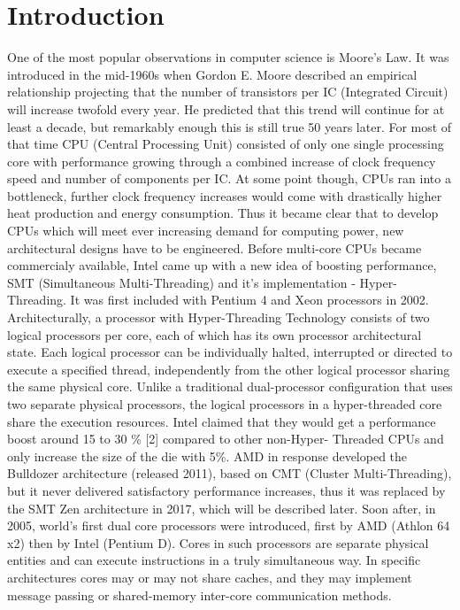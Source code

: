 \chapter{Introduction}

One of the most popular observations in computer science is Moore's Law.
It was introduced in the mid-1960s when Gordon E. Moore described an empirical relationship \cite{Moore}
projecting that the number of transistors per IC (Integrated Circuit) will increase twofold every year.
He predicted that this trend will continue for at least a decade, but remarkably enough this is still true 50 years later. 
For most of that time CPU (Central Processing Unit) consisted of only one single processing core with performance growing through a combined increase of clock frequency speed and number of components per IC. At some point though, CPUs ran into a bottleneck,
further clock frequency increases would come with drastically higher heat production and energy consumption. Thus it became clear that to develop CPUs which will meet ever increasing demand for computing power, new architectural designs have to be engineered.
\newline
Before multi-core CPUs became commercialy available, Intel came up with a new idea of boosting performance, SMT (Simultaneous Multi-Threading) and it's implementation - Hyper-Threading. It was first included with Pentium 4 and Xeon processors in 2002. Architecturally, a processor with Hyper-Threading Technology consists of two logical processors per core, each of which has its own processor architectural state. Each logical processor can be individually halted, interrupted or directed to execute a specified thread, independently from the other logical processor sharing the same physical core.
Unlike a traditional dual-processor configuration that uses two separate physical processors, the logical processors in a hyper-threaded core share the execution resources. Intel claimed that they would get a performance boost around 15 to 30 \% [2] compared to other non-Hyper-
Threaded CPUs and only increase the size of the die with 5\%. AMD in response developed the Bulldozer architecture (released 2011), based on CMT (Cluster Multi-Threading), but it never delivered satisfactory performance increases, thus it was replaced by the SMT Zen architecture in 2017, which will be described later.
\newline
Soon after, in 2005, world's first dual core processors were introduced, first by AMD (Athlon 64 x2) then by Intel (Pentium D). Cores in such processors are separate physical entities and can execute instructions in a truly simultaneous way. In specific architectures cores may or may not share caches, and they may implement message passing or shared-memory inter-core communication methods. 
